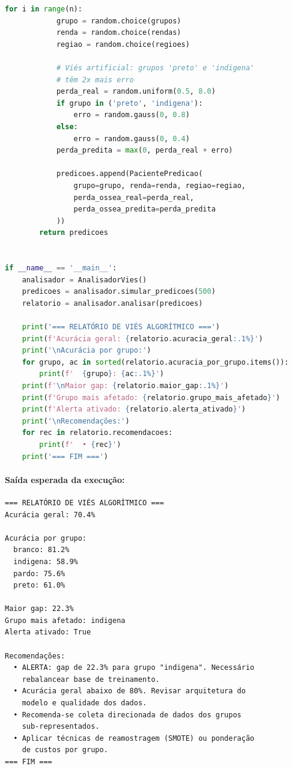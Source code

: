 \begin{lstlisting}[language=Python, caption=Analisador de viés algorítmico em preditor periodontal, label=lst:vies]
        for i in range(n):
            grupo = random.choice(grupos)
            renda = random.choice(rendas)
            regiao = random.choice(regioes)

            # Viés artificial: grupos 'preto' e 'indigena'
            # têm 2x mais erro
            perda_real = random.uniform(0.5, 8.0)
            if grupo in ('preto', 'indigena'):
                erro = random.gauss(0, 0.8)
            else:
                erro = random.gauss(0, 0.4)
            perda_predita = max(0, perda_real + erro)

            predicoes.append(PacientePredicao(
                grupo=grupo, renda=renda, regiao=regiao,
                perda_ossea_real=perda_real,
                perda_ossea_predita=perda_predita
            ))
        return predicoes


if __name__ == '__main__':
    analisador = AnalisadorVies()
    predicoes = analisador.simular_predicoes(500)
    relatorio = analisador.analisar(predicoes)

    print('=== RELATÓRIO DE VIÉS ALGORÍTMICO ===')
    print(f'Acurácia geral: {relatorio.acuracia_geral:.1%}')
    print('\nAcurácia por grupo:')
    for grupo, ac in sorted(relatorio.acuracia_por_grupo.items()):
        print(f'  {grupo}: {ac:.1%}')
    print(f'\nMaior gap: {relatorio.maior_gap:.1%}')
    print(f'Grupo mais afetado: {relatorio.grupo_mais_afetado}')
    print(f'Alerta ativado: {relatorio.alerta_ativado}')
    print('\nRecomendações:')
    for rec in relatorio.recomendacoes:
        print(f'  • {rec}')
    print('=== FIM ===')
\end{lstlisting}

\paragraph{Saída esperada da execução:}
\begin{lstlisting}[style=output]
=== RELATÓRIO DE VIÉS ALGORÍTMICO ===
Acurácia geral: 70.4%

Acurácia por grupo:
  branco: 81.2%
  indigena: 58.9%
  pardo: 75.6%
  preto: 61.0%

Maior gap: 22.3%
Grupo mais afetado: indigena
Alerta ativado: True

Recomendações:
  • ALERTA: gap de 22.3% para grupo "indigena". Necessário
    rebalancear base de treinamento.
  • Acurácia geral abaixo de 80%. Revisar arquitetura do
    modelo e qualidade dos dados.
  • Recomenda-se coleta direcionada de dados dos grupos
    sub-representados.
  • Aplicar técnicas de reamostragem (SMOTE) ou ponderação
    de custos por grupo.
=== FIM ===
\end{lstlisting}

